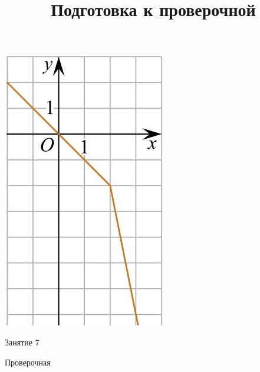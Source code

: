 \begin{homework}[number=3]
\begin{listofex}
\begin{minipage}[c]{0.1\textwidth}
				\includegraphics[align=t, width=\textwidth]{../../pics/G101M4C5-9.jpg}
			\end{minipage}
		\end{listofex}
	\end{homework}
	
	\begin{class}[number=7]
		\title{Подготовка к проверочной}
		\begin{listofex}
			\item Занятие 7
		\end{listofex}
	\end{class}
	
	\begin{exam}
		\begin{listofex}
			\item Проверочная
		\end{listofex}
	\end{exam}

